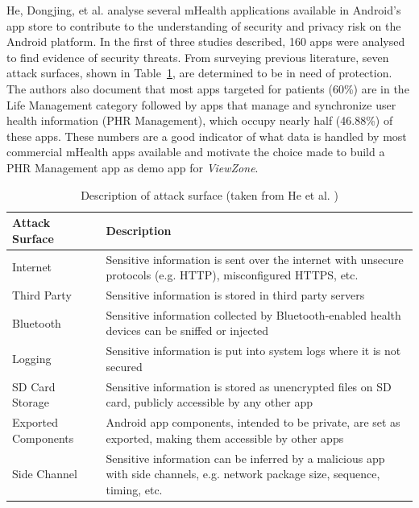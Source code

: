 He, Dongjing, et al. \cite{he2014security} analyse several mHealth applications available in Android's app store to contribute to the understanding of security and privacy risk on the Android platform. In the first of three studies described, 160 apps were analysed to find evidence of security threats. From surveying previous literature, seven attack surfaces, shown in Table~\ref{tab:attacksurfaces}, are determined to be in need of protection.
The authors also document that most apps targeted for patients (60\%) are in the Life Management category followed by apps that manage and synchronize user health information (\ac{PHR} Management), which occupy nearly half (46.88\%) of these apps. These numbers are a good indicator of what data is handled by most commercial mHealth apps available and motivate the choice made to build a \ac{PHR} Management app as demo app for \emph{ViewZone}.

\begin{table}[t]
	\caption {Description of attack surface (taken from He et al. \cite{he2014security})}
	\label{tab:attacksurfaces}
	\begin{tabular}{|>{\raggedright}p{2cm}|>{\raggedright\arraybackslash}p{10cm}|}
		\hline
		\textbf{Attack Surface}      & \textbf{Description}                                                                                                                    \\ \hline
		Internet            & Sensitive information is sent over the internet with unsecure protocols (e.g. HTTP), misconfigured HTTPS, etc.                 \\ \hline
		Third Party         & Sensitive information is stored in third party servers                                                                         \\ \hline
		Bluetooth           & Sensitive information collected by Bluetooth-enabled health devices can be sniffed or injected                                 \\ \hline
		Logging             & Sensitive information is put into system logs where it is not secured                                                          \\ \hline
		SD Card Storage     & Sensitive information is stored as unencrypted files on SD card, publicly accessible by any other app                          \\ \hline
		Exported Components &  Android app components, intended to be private, are set as exported, making them accessible by other apps                     \\ \hline
		Side Channel        & Sensitive information can be inferred by a malicious app with side channels, e.g. network package size, sequence, timing, etc. \\ \hline
	\end{tabular}
\end{table}

